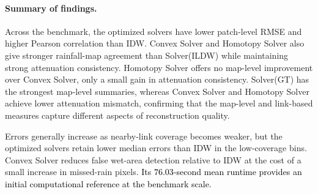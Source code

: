 \documentclass[11pt]{article}
\begin{document}
{\color{black}
\paragraph*{Summary of findings.} Across the benchmark, the optimized solvers have lower patch-level RMSE and higher Pearson correlation than IDW. Convex Solver and Homotopy Solver also give stronger rainfall-map agreement than Solver(ILDW) while maintaining strong attenuation consistency. Homotopy Solver offers no map-level improvement over Convex Solver, only a small gain in attenuation consistency. Solver(GT) has the strongest map-level summaries, whereas Convex Solver and Homotopy Solver achieve lower attenuation mismatch, confirming that the map-level and link-based measures capture different aspects of reconstruction quality.

Errors generally increase as nearby-link coverage becomes weaker, but the optimized solvers retain lower median errors than IDW in the low-coverage bins. Convex Solver reduces false wet-area detection relative to IDW at the cost of a small increase in missed-rain pixels. \textcolor{black}{Its $76.03$-second mean runtime provides an initial computational reference at the benchmark scale.}
}




\end{document}
